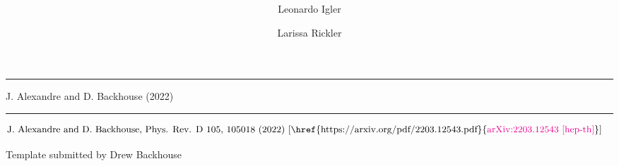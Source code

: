 \documentclass[12pt,preprintnumbers,amsmath,amssymb,nofootinbib,superscriptaddress]{revtex4-1}
\newcommand{\bea}{\begin{eqnarray}}
\newcommand{\eea}{\end{eqnarray}}
\newcommand{\pink}{\textcolor{magenta}} %
\begin{document}
\iffalse
\tikz[overlay,remember picture]
{
    \node at ($(current page.west)+(1,0)$) [rotate=90] {\Large\textcolor{gray}{arXiv:0000.12345 [hep-th] 30 June 1999}};
}
\fi




\hfill{}

\vspace{2.5cm}

\title{
}

\author{Leonardo Igler}
\author{Larissa Rickler}



\maketitle

\newpage

\vspace{-0.7cm}
\vspace{-0.2cm}
\hrule

\vspace{\fill}
\centering
[1] J. Alexandre and D. Backhouse (2022)

\newpage 

\vspace{-0.2cm}\hrule

\bea
[1] & \text{J. Alexandre and D. Backhouse, Phys. Rev. D 105, 105018 (2022) [\href{https://arxiv.org/pdf/2203.12543.pdf}{\pink{arXiv:2203.12543 [hep-th]}}]}\nonumber
\eea

\vspace{\fill}
\centering
Template submitted by Drew Backhouse
\end{document}
